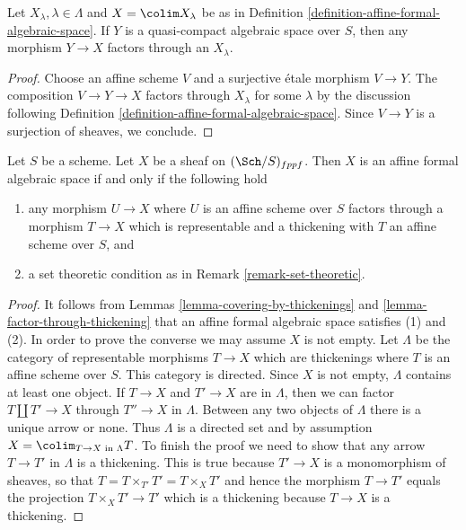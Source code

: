 \begin{lemma}
\label{lemma-factor-through-thickening}
Let $X_\lambda, \lambda \in \Lambda$ and $X = \colim X_\lambda$
be as in Definition \ref{definition-affine-formal-algebraic-space}.
If $Y$ is a quasi-compact algebraic space over $S$, then any
morphism $Y \to X$ factors through an $X_\lambda$.
\end{lemma}

\begin{proof}
Choose an affine scheme $V$ and a surjective \'etale morphism
$V \to Y$. The composition $V \to Y \to X$ factors through
$X_\lambda$ for some $\lambda$ by the discussion following
Definition \ref{definition-affine-formal-algebraic-space}.
Since $V \to Y$ is a surjection of sheaves, we conclude.
\end{proof}

\begin{lemma}
\label{lemma-characterize-affine-formal-algebraic-space}
Let $S$ be a scheme. Let $X$ be a sheaf on $(\Sch/S)_{fppf}$.
Then $X$ is an affine formal algebraic space if and only if
the following hold
\begin{enumerate}
\item any morphism $U \to X$ where $U$ is an affine scheme over $S$
factors through a morphism $T \to X$ which is representable and a
thickening with $T$ an affine scheme over $S$, and
\item a set theoretic condition as in Remark \ref{remark-set-theoretic}.
\end{enumerate}
\end{lemma}

\begin{proof}
It follows from Lemmas \ref{lemma-covering-by-thickenings} and
\ref{lemma-factor-through-thickening} that an affine formal algebraic space
satisfies (1) and (2). In order to prove the converse we may
assume $X$ is not empty.
Let $\Lambda$ be the category of representable morphisms $T \to X$ which are
thickenings where $T$ is an affine scheme over $S$. This category
is directed. Since $X$ is not empty, $\Lambda$ contains at least one
object. If $T \to X$ and $T' \to X$ are in $\Lambda$, then we can
factor $T \amalg T' \to X$ through $T'' \to X$ in $\Lambda$. Between
any two objects of $\Lambda$ there is a unique arrow or none. Thus
$\Lambda$ is a directed set and by assumption
$X = \colim_{T \to X\text{ in }\Lambda} T$. To finish the proof
we need to show that any arrow $T \to T'$ in $\Lambda$ is a thickening.
This is true because $T' \to X$ is a monomorphism of sheaves, so that
$T = T \times_{T'} T' = T \times_X T'$ and hence the morphism
$T \to T'$ equals the projection $T \times_X T' \to T'$ which is
a thickening because $T \to X$ is a thickening.
\end{proof}

